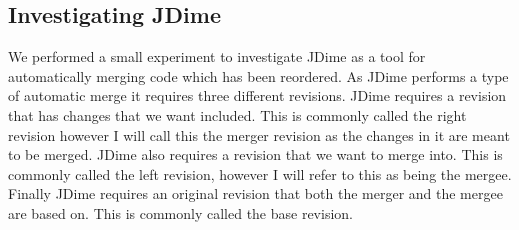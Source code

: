 \subsection{Investigating JDime}
We performed a small experiment to investigate JDime as a tool for automatically merging code which has been reordered.
% 
% 
As JDime performs a type of automatic merge it requires three different revisions.
JDime requires a revision that has changes that we want included.  This is commonly called the right revision however I will call this the merger revision as the changes in it are meant to be merged.
JDime also requires a revision that we want to merge into.  This is commonly called the left revision, however I will refer to this as being the mergee. 
Finally JDime requires an original revision that both the merger and the mergee are based on.
This is commonly called the base revision.

